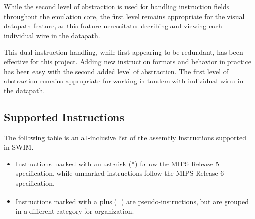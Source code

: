 \documentclass[
    paper=letter,
    parskip=half,
    fontsize=12pt,
    titlepage=firstiscover,
    toc=bibliography,
    numbers=endperiod
]{scrartcl}
\providecommand{\tightlist}{%
  \setlength{\itemsep}{0pt}\setlength{\parskip}{0pt}}
\begin{document}
While the second level of abstraction is used for handling instruction
fields throughout the emulation core, the first level remains
appropriate for the visual datapath feature, as this feature
necessitates decribing and viewing each individual wire in the datapath.

This dual instruction handling, while first appearing to be redundant,
has been effective for this project. Adding new instruction formats and
behavior in practice has been easy with the second added level of
abstraction. The first level of abstraction remains appropriate for
working in tandem with individual wires in the datapath.

\subsection{Supported Instructions}
\label{subsec:supported-instructions}

The following table is an all-inclusive list of the assembly
instructions supported in SWIM.

\begin{itemize}
    \tightlist
    \item Instructions marked with an asterisk (*) follow the MIPS Release 5
          specification, while unmarked instructions follow the MIPS Release 6
          specification.
    \item Instructions marked with a plus (\textsuperscript{+}) are
          pseudo-instructions, but are grouped in a different category for
          organization.
\end{itemize}
\end{document}
